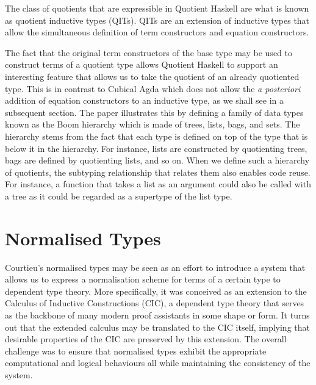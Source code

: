\documentclass[12pt,twoside,maitrise]{dms}
\theoremstyle{definition}
\numberwithin{equation}{section}
\numberwithin{table}{chapter}
\numberwithin{figure}{chapter}
\newcommand\latinphrase{\textit}
\begin{document}
The class of quotients that are expressible in Quotient Haskell are what is
known as quotient inductive types (QITs)\cite{fiore2022quotients, HoTTbook}.
QITs are an extension of inductive types that allow the simultaneous definition
of term constructors and equation constructors.

The fact that the original term constructors of the base type may be used to
construct terms of a quotient type allows Quotient Haskell to support an
interesting feature that allows us to take the quotient of an already quotiented
type. This is in contrast to Cubical Agda which does not allow the
\latinphrase{a posteriori} addition of equation constructors to an inductive
type, as we shall see in a subsequent section. The paper illustrates this by
defining a family of data types known as the Boom
hierarchy\cite{meertens1986algorithmics} which is made of trees, lists, bags,
and sets. The hierarchy stems from the fact that each type is defined on top of
the type that is below it in the hierarchy. For instance, lists are constructed
by quotienting trees, bags are defined by quotienting lists, and so on. When we
define such a hierarchy of quotients, the subtyping relationship that relates
them also enables code reuse. For instance, a function that takes a list as an
argument could also be called with a tree as it could be regarded as a supertype
of the list type.

\section{Normalised Types}\label{sec:normalised-types-courtieu}

Courtieu's normalised types\cite{courtieu-normalizedtypes} may be seen as an
effort to introduce a system that allows us to express a normalisation scheme
for terms of a certain type to dependent type theory. More specifically,
it was conceived as an extension to the Calculus of Inductive Constructions
(CIC)\cite{werner-cic}, a dependent type theory that serves as the backbone of
many modern proof assistants in some shape or form. It turns out that the
extended calculus may be translated to the CIC itself, implying that desirable
properties of the CIC are preserved by this extension. The overall challenge was
to ensure that normalised types exhibit the appropriate computational and
logical behaviours all while maintaining the consistency of the system.
\end{document}
